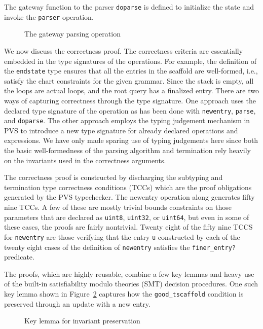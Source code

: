 \documentclass[sigplan,10pt,anonymous,review]{acmart}\settopmatter{printfolios=true,printccs=false,printacmref=false}
\begin{document}
\begin{CCSXML}
The gateway function to the parser \texttt{doparse} is defined to initialize
the state and invoke the \texttt{parser} operation\@.
\begin{figure}[h!]
  
    \vspace*{-4mm}
\caption{\small The gateway parsing operation}
\label{pvs:doparse}
\end{figure}

We now discuss the correctness proof.  The correctness criteria are
essentially embedded in the type signatures of the operations.
For example, the definition of the \texttt{endstate} type ensures that
all the entries in the scaffold are well-formed, i.e., satisfy the chart constraints for the given grammar.   Since the stack is empty, all the loops are actual
loops, and the root query has a finalized entry.  There are two ways of
capturing correctness through the type signature.  One approach uses the declared
type signature of the operation as has been done with \texttt{newentry},  
\texttt{parse}, and \texttt{doparse}\@.  The other approach employs the
typing judgement mechanism in PVS to introduce a new type signature for
already declared operations and expressions.  We have only made sparing
use of typing judgements here since both the basic well-formedness of the
parsing algorithm and termination rely heavily on the invariants used in
the correctness arguments.

The correctness proof is constructed by discharging the subtyping and
termination type correctness conditions (TCCs) which are the proof
obligations generated by the PVS typechecker.  The newentry operation
along generates fifty nine TCCs.  A few of these are mostly trivial
bounds constraints on those parameters that are declared as
\texttt{uint8}, \texttt{uint32}, or \texttt{uint64}, but even in some
of these cases, the proofs are fairly nontrivial. Twenty eight of the
fifty nine TCCS for \texttt{newentry} are those verifying that the
entry \texttt{u} constructed by each of the twenty eight cases of the
definition of \texttt{newentry} satisfies the \texttt{finer\_entry?}
predicate.

The proofs, which are highly reusable, combine 
a few key lemmas and heavy use of the built-in satisfiability modulo
theories (SMT) decision procedures.  One such key lemma
shown in Figure~\ref{pvs:goodgoodtscaffold} captures how the
\texttt{good\_tscaffold} condition is preserved through an update
with a new entry.  
\begin{figure}[h!]
  
    \vspace*{-4mm}
\caption{\small Key lemma for invariant preservation}
\label{pvs:goodgoodtscaffold}
\end{figure}




\end{CCSXML}
\end{document}
